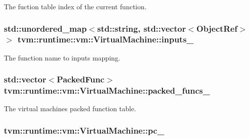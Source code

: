 The fuction table index of the current function. 

\subsubsection[{\texorpdfstring{inputs\+\_\+}{inputs_}}]{\setlength{\rightskip}{0pt plus 5cm}std\+::unordered\+\_\+map$<$std\+::string, std\+::vector$<${\bf Object\+Ref}$>$ $>$ tvm\+::runtime\+::vm\+::\+Virtual\+Machine\+::inputs\+\_\+\hspace{0.3cm}{\ttfamily [protected]}}\hypertarget{classtvm_1_1runtime_1_1vm_1_1VirtualMachine_a7d46e436c01133647cd303719752f456}{}\label{classtvm_1_1runtime_1_1vm_1_1VirtualMachine_a7d46e436c01133647cd303719752f456}


The function name to inputs mapping. 

\subsubsection[{\texorpdfstring{packed\+\_\+funcs\+\_\+}{packed_funcs_}}]{\setlength{\rightskip}{0pt plus 5cm}std\+::vector$<${\bf Packed\+Func}$>$ tvm\+::runtime\+::vm\+::\+Virtual\+Machine\+::packed\+\_\+funcs\+\_\+\hspace{0.3cm}{\ttfamily [protected]}}\hypertarget{classtvm_1_1runtime_1_1vm_1_1VirtualMachine_ae2e5377a5dbf7335ed8989512457a2f5}{}\label{classtvm_1_1runtime_1_1vm_1_1VirtualMachine_ae2e5377a5dbf7335ed8989512457a2f5}


The virtual machine\textquotesingle{}s packed function table. 

\subsubsection[{\texorpdfstring{pc\+\_\+}{pc_}}]{ tvm\+::runtime\+::vm\+::\+Virtual\+Machine\+::pc\+\_\+\hspace{0.3cm}{\ttfamily [protected]}}\hypertarget{classtvm_1_1runtime_1_1vm_1_1VirtualMachine_a583f4afb3292882df571a4fdf3cbf947}{}\label{classtvm_1_1runtime_1_1vm_1_1VirtualMachine_a583f4afb3292882df571a4fdf3cbf947}


